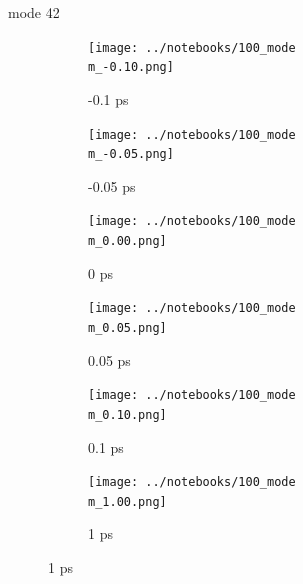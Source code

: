 \documentclass{beamer}
\begin{document}
\renewcommand\m{42}
\begin{frame}{mode \m}
	\begin{figure}
		\centering
		\begin{subfigure}[b]{\w\textwidth}
			\centering
			\texttt{[image: ../notebooks/100\_mode\\m\_-0.10.png]}
			\caption{-0.1 ps}
		\end{subfigure}
		\begin{subfigure}[b]{\w\textwidth}
			\centering
			\texttt{[image: ../notebooks/100\_mode\\m\_-0.05.png]}
			\caption{-0.05 ps}
		\end{subfigure}
		\begin{subfigure}[b]{\w\textwidth}
			\centering
			\texttt{[image: ../notebooks/100\_mode\\m\_0.00.png]}
			\caption{0 ps}
		\end{subfigure}
		\begin{subfigure}[b]{\w\textwidth}
			\centering
			\texttt{[image: ../notebooks/100\_mode\\m\_0.05.png]}
			\caption{0.05 ps}
		\end{subfigure}
		\begin{subfigure}[b]{\w\textwidth}
			\centering
			\texttt{[image: ../notebooks/100\_mode\\m\_0.10.png]}
			\caption{0.1 ps}
		\end{subfigure}
		\begin{subfigure}[b]{\w\textwidth}
			\centering
			\texttt{[image: ../notebooks/100\_mode\\m\_1.00.png]}
			\caption{1 ps}
		\end{subfigure}
	\end{figure}
\end{frame}
\end{document}
